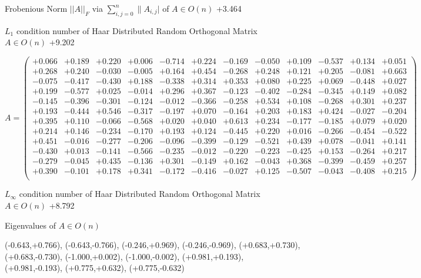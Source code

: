 \documentclass[9pt]{article}
\theoremstyle{plain}
\theoremstyle{definition}
\theoremstyle{remark}
\numberwithin{equation}{section}
\begin{document}
Frobenious Norm  $||A||_{\textit{F}}$ via $\sum\limits_{i,j =0}^{n} \|A_{i,j}|$   of  $A \in O(n)$  +3.464

$L_1$ condition number of Haar Distributed Random Orthogonal Matrix $A \in O(n)$ +9.202

$A = \left(
\begin{array}{
cccccccccccc}
+0.066 & +0.189 & +0.220 & +0.006 & -0.714 & +0.224 & -0.169 & -0.050 & +0.109 & -0.537 & +0.134 & +0.051 \\
+0.268 & +0.240 & -0.030 & -0.005 & +0.164 & +0.454 & -0.268 & +0.248 & +0.121 & +0.205 & -0.081 & +0.663 \\
-0.075 & -0.417 & -0.430 & +0.188 & -0.338 & +0.314 & +0.353 & +0.080 & +0.225 & +0.069 & -0.448 & +0.027 \\
+0.199 & -0.577 & +0.025 & -0.014 & +0.296 & +0.367 & -0.123 & -0.402 & -0.284 & -0.345 & +0.149 & +0.082 \\
-0.145 & -0.396 & -0.301 & -0.124 & -0.012 & -0.366 & -0.258 & +0.534 & +0.108 & -0.268 & +0.301 & +0.237 \\
+0.193 & -0.444 & +0.546 & -0.317 & -0.197 & +0.070 & -0.164 & +0.203 & +0.183 & +0.424 & -0.027 & -0.204 \\
+0.395 & +0.110 & -0.066 & -0.568 & +0.020 & +0.040 & +0.613 & +0.234 & -0.177 & -0.185 & +0.079 & +0.020 \\
+0.214 & +0.146 & -0.234 & -0.170 & +0.193 & +0.124 & -0.445 & +0.220 & +0.016 & -0.266 & -0.454 & -0.522 \\
+0.451 & -0.016 & -0.277 & -0.206 & -0.096 & -0.399 & -0.129 & -0.521 & +0.439 & +0.078 & -0.041 & +0.141 \\
-0.430 & +0.013 & -0.141 & -0.566 & -0.235 & -0.012 & -0.220 & -0.223 & -0.425 & +0.153 & -0.264 & +0.217 \\
-0.279 & -0.045 & +0.435 & -0.136 & +0.301 & -0.149 & +0.162 & -0.043 & +0.368 & -0.399 & -0.459 & +0.257 \\
+0.390 & -0.101 & +0.178 & +0.341 & -0.172 & -0.416 & -0.027 & +0.125 & -0.507 & -0.043 & -0.408 & +0.215 \\
\end{array}
\right)$ \newline 

$L_{\infty}$ condition number of Haar Distributed Random Orthogonal Matrix $A \in O(n)$ +8.792

Eigenvalues of $A \in O(n)$

(-0.643,+0.766), (-0.643,-0.766), (-0.246,+0.969), (-0.246,-0.969), (+0.683,+0.730), (+0.683,-0.730), (-1.000,+0.002), (-1.000,-0.002), (+0.981,+0.193), (+0.981,-0.193), (+0.775,+0.632), (+0.775,-0.632)
\end{document}
